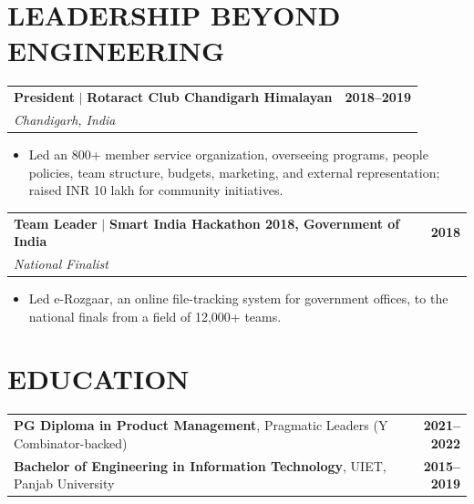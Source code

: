 \documentclass[10pt,a4paper]{article}
\makeatletter
\newcommand{\role}[4]{%
  \Needspace*{5\baselineskip}%
  \begin{tabularx}{\textwidth}{@{}Xr@{}}
    \textbf{\color{ink}#1} $\mid$ \textbf{#2} & \textbf{#3} \\
    \textit{#4} &
  \end{tabularx}\vspace{-4pt}
}
\makeatother
\begin{document}
\section{LEADERSHIP BEYOND ENGINEERING}
\role{President}{Rotaract Club Chandigarh Himalayan}{2018--2019}{Chandigarh, India}
\begin{itemize}
  \item Led an 800+ member service organization, overseeing programs, people policies, team structure, budgets, marketing, and external representation; raised INR 10 lakh for community initiatives.
\end{itemize}

\role{Team Leader}{Smart India Hackathon 2018, Government of India}{2018}{National Finalist}
\begin{itemize}
  \item Led e-Rozgaar, an online file-tracking system for government offices, to the national finals from a field of 12,000+ teams.
\end{itemize}

\section{EDUCATION}
\begin{tabularx}{\textwidth}{@{}Xr@{}}
\textbf{PG Diploma in Product Management}, Pragmatic Leaders (Y Combinator-backed) & \textbf{2021--2022} \\
\textbf{Bachelor of Engineering in Information Technology}, UIET, Panjab University & \textbf{2015--2019}
\end{tabularx}
\end{document}

